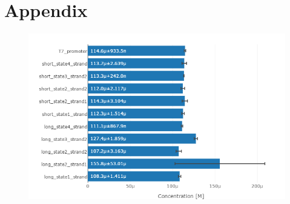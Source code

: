 \section{Appendix}

\begin{figure}[H]
\centering
\includegraphics[width=\columnwidth]{images/oligo_concentrations.png}
\caption{}
\label{oligo_concentrations}
\end{figure}
